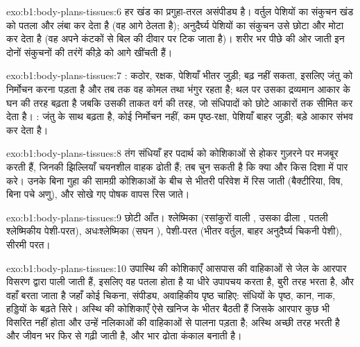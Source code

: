 \begin{solution}{exo:b1:body-plans-tissues:6}
हर खंड का प्रगुहा-तरल असंपीड्य है। वर्तुल पेशियों का संकुचन खंड को पतला
और लंबा कर देता है (वह आगे ठेलता है); अनुदैर्घ्य पेशियों का संकुचन उसे
छोटा और मोटा कर देता है (वह अपने कंटकों से बिल की दीवार पर टिक जाता है)।
शरीर भर पीछे की ओर जाती इन दोनों संकुचनों की तरंगें कीड़े को आगे खींचती हैं।
\end{solution}

\begin{solution}{exo:b1:body-plans-tissues:7}
: कठोर, रक्षक, पेशियाँ भीतर जुड़ी; बढ़ नहीं सकता,
इसलिए जंतु को निर्मोचन करना पड़ता है और तब तक वह कोमल तथा भंगुर रहता है;
थल पर उसका द्रव्यमान आकार के घन की तरह बढ़ता है जबकि उसकी ताकत वर्ग की
तरह, जो संधिपादों को छोटे आकारों तक सीमित कर देता है। : जंतु के
साथ बढ़ता है, कोई निर्मोचन नहीं, कम पृष्ठ-रक्षा, पेशियाँ बाहर जुड़ी;
बड़े आकार संभव कर देता है।
\end{solution}

\begin{solution}{exo:b1:body-plans-tissues:8}
तंग संधियाँ हर पदार्थ को कोशिकाओं से होकर गुज़रने पर मजबूर करती हैं,
जिनकी झिल्लियाँ चयनशील वाहक ढोती हैं; तब  चुन सकती है कि क्या और
किस दिशा में पार करे। उनके बिना गुहा की सामग्री कोशिकाओं के बीच से भीतरी
परिवेश में रिस जाती (बैक्टीरिया, विष, बिना पचे अणु), और सोखे गए पोषक
वापस रिस जाते।
\end{solution}

\begin{solution}{exo:b1:body-plans-tissues:9}
छोटी आँत। श्लेष्मिका (रसांकुरों वाली , उसका ढीला , पतली श्लेष्मिकीय पेशी-परत), अधःश्लेष्मिका (सघन ), पेशी-परत (भीतर वर्तुल, बाहर अनुदैर्घ्य चिकनी पेशी),
सीरमी परत।
\end{solution}

\begin{solution}{exo:b1:body-plans-tissues:10}
उपास्थि की कोशिकाएँ आसपास की वाहिकाओं से जेल के आरपार विसरण द्वारा पाली
जाती हैं, इसलिए वह  पतला होता है या धीरे उपापचय करता है, बुरी तरह
भरता है, और वहाँ बरता जाता है जहाँ कोई चिकना, संपीड्य, अवाहिकीय पृष्ठ
चाहिए: संधियों के पृष्ठ, कान, नाक, हड्डियों के बढ़ते सिरे। अस्थि की
कोशिकाएँ ऐसे खनिज के भीतर बैठती हैं जिसके आरपार कुछ भी विसरित नहीं होता
और उन्हें नलिकाओं की वाहिकाओं से पालना पड़ता है; अस्थि अच्छी तरह भरती है
और जीवन भर फिर से गढ़ी जाती है, और भार ढोता कंकाल बनाती है।
\end{solution}

